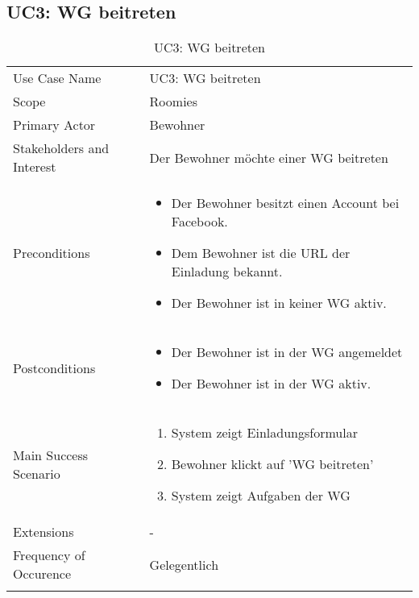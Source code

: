 \subsection{UC3: WG beitreten}
\begin{table}[H]
	\tablestyle
	\tablealtcolored
	\begin{tabularx}{\textwidth}{lX}
		\tablebody
			Use Case Name &
			UC3: WG beitreten
			\tabularnewline
			Scope &
			Roomies
			\tabularnewline
			Primary Actor &
			Bewohner
			\tabularnewline
			Stakeholders and Interest &
			Der Bewohner möchte einer WG beitreten
			\tabularnewline
			Preconditions &
			\begin{itemize}
				\item Der Bewohner besitzt einen Account bei Facebook.
				\item Dem Bewohner ist die URL der Einladung bekannt.
				\item Der Bewohner ist in keiner WG aktiv.
			\end{itemize}
			\tabularnewline
			Postconditions &
			\begin{itemize}
				\item Der Bewohner ist in der WG angemeldet
				\item Der Bewohner ist in der WG aktiv.
			\end{itemize}
			\tabularnewline
			Main Success Scenario &
			\begin{enumerate}
				\item System zeigt Einladungsformular
				\item Bewohner klickt auf 'WG beitreten'
				\item System zeigt Aufgaben der WG
			\end{enumerate}
			\tabularnewline
			Extensions &
			-
			\tabularnewline
			Frequency of Occurence &
			Gelegentlich
			\tabularnewline
		\tableend
	\end{tabularx}
	\caption{UC3: WG beitreten}
\end{table}


